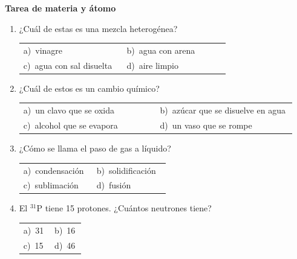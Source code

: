 \documentclass[11pt,a4paper]{article}
\begin{document}
{\Large\bfseries Tarea de materia y átomo}
\vspace{12pt}
\begin{enumerate}[label=\textbf{\arabic*.},leftmargin=*,itemsep=11pt,topsep=0pt]
\item \begin{minipage}[t]{\linewidth}
¿Cuál de estas es una mezcla heterogénea?

\vspace{5pt}
\begin{tabular}{@{}p{0.47\linewidth}p{0.47\linewidth}@{}}
a)~vinagre & b)~agua con arena \\
c)~agua con sal disuelta & d)~aire limpio \\
\end{tabular}
\end{minipage}

\item \begin{minipage}[t]{\linewidth}
¿Cuál de estos es un cambio químico?

\vspace{5pt}
\begin{tabular}{@{}p{0.47\linewidth}p{0.47\linewidth}@{}}
a)~un clavo que se oxida & b)~azúcar que se disuelve en agua \\
c)~alcohol que se evapora & d)~un vaso que se rompe \\
\end{tabular}
\end{minipage}

\item \begin{minipage}[t]{\linewidth}
¿Cómo se llama el paso de gas a líquido?

\vspace{5pt}
\begin{tabular}{@{}p{0.47\linewidth}p{0.47\linewidth}@{}}
a)~condensación & b)~solidificación \\
c)~sublimación & d)~fusión \\
\end{tabular}
\end{minipage}

\item \begin{minipage}[t]{\linewidth}
El ${}^{31}\mathrm{P}$ tiene 15 protones. ¿Cuántos neutrones tiene?

\vspace{5pt}
\begin{tabular}{@{}p{0.47\linewidth}p{0.47\linewidth}@{}}
a)~31 & b)~16 \\
c)~15 & d)~46 \\
\end{tabular}
\end{minipage}


\end{enumerate}
\end{document}
